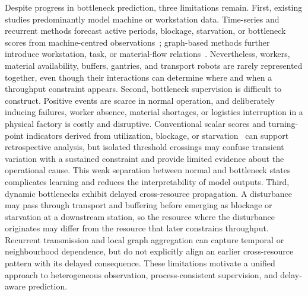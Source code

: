 \documentclass[a4paper,fleqn]{cas-dc}
\begin{document}
Despite progress in bottleneck prediction, three limitations remain. First, existing studies predominantly model machine or workstation data. Time-series and recurrent methods forecast active periods, blockage, starvation, or bottleneck scores from machine-centred observations~\cite{li2011throughput,subramaniyan2018data,lai2018twolayer,liu2023lstmdam}; graph-based methods further introduce workstation, task, or material-flow relations~\cite{lai2023bstan,yin2025btgcn,ma2023tusb,cen2025dstnn,wu2025knowledge}. Nevertheless, workers, material availability, buffers, gantries, and transport robots are rarely represented together, even though their interactions can determine where and when a throughput constraint appears. Second, bottleneck supervision is difficult to construct. Positive events are scarce in normal operation, and deliberately inducing failures, worker absence, material shortages, or logistics interruption in a physical factory is costly and disruptive. Conventional scalar scores and turning-point indicators derived from utilization, blockage, or starvation~\cite{li2009data,subramaniyan2023throughput,lai2021data,su2022dynamic} can support retrospective analysis, but isolated threshold crossings may confuse transient variation with a sustained constraint and provide limited evidence about the operational cause. This weak separation between normal and bottleneck states complicates learning and reduces the interpretability of model outputs. Third, dynamic bottlenecks exhibit delayed cross-resource propagation. A disturbance may pass through transport and buffering before emerging as blockage or starvation at a downstream station, so the resource where the disturbance originates may differ from the resource that later constrains throughput. Recurrent transmission and local graph aggregation can capture temporal or neighbourhood dependence, but do not explicitly align an earlier cross-resource pattern with its delayed consequence. These limitations motivate a unified approach to heterogeneous observation, process-consistent supervision, and delay-aware prediction.
\end{document}
